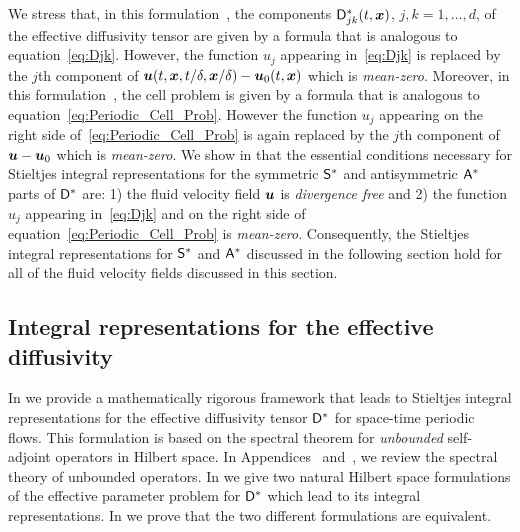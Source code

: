 \documentclass[amsa]{ipart}
\begin{document}
We stress that, in this formulation~\cite{Pavliotis:PHD_Thesis},
the components $\mathsf{D}^*_{jk}(t,\boldsymbol{x})$, $j,k=1,\ldots,d$, of the effective
diffusivity tensor are
given by a formula that is analogous to
equation~\eqref{eq:Djk}. However, the function $u_j$ appearing
in~\eqref{eq:Djk} is replaced by the $j$th component of
$\boldsymbol{u}(t,\boldsymbol{x},t/\delta,\boldsymbol{x}/\delta)-\boldsymbol{u}_0(t,\boldsymbol{x})$ which is
\emph{mean-zero}. Moreover, in this
formulation~\cite{Pavliotis:PHD_Thesis}, the cell problem is given by
a formula that is analogous to equation~\eqref{eq:Periodic_Cell_Prob}.
However the function $u_j$ appearing on the right side
of~\eqref{eq:Periodic_Cell_Prob} is again replaced by the $j$th
component of $\boldsymbol{u}-\boldsymbol{u}_0$ which is \emph{mean-zero}. We show in
 that the essential
conditions necessary for Stieltjes integral representations for  the
symmetric $\mathsf{S}^*$ and antisymmetric $\mathsf{A}^*$ parts of $\mathsf{D}^*$ 
are: 1) the fluid velocity field $\boldsymbol{u}$ is \emph{divergence free} and
2) the function $u_j$ appearing in~\eqref{eq:Djk} and on the right
side of equation~\eqref{eq:Periodic_Cell_Prob} is
\emph{mean-zero}. Consequently, the Stieltjes integral representations
for $\mathsf{S}^*$ and $\mathsf{A}^*$ discussed in the following section hold for all of
the fluid velocity fields discussed in this section. 












\subsection{Integral representations for the effective diffusivity}
%
In  we provide a mathematically rigorous
framework that leads to Stieltjes integral representations for the
effective diffusivity tensor $\mathsf{D}^*$ for space-time periodic
flows. This formulation is based on the 
spectral theorem for \emph{unbounded} self-adjoint operators in
Hilbert space. In Appendices~ 
and~, we review the spectral theory 
of 
unbounded operators. In  
we give two natural Hilbert space formulations of the effective
parameter problem for $\mathsf{D}^*$ which lead to its integral
representations. In  we prove
that the two different formulations are equivalent.   
\end{document}
